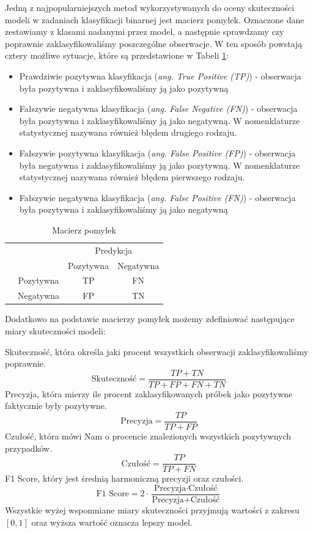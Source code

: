 \documentclass[inzynierska]{pwr_wmat_praca_dyplomowa}
\theoremstyle{plain}
\numberwithin{theorem}{chapter}
\theoremstyle{definition}
\numberwithin{theorem}{chapter}
\begin{document}
Jedną z najpopularniejszych metod wykorzystywanych do oceny skuteczności modeli w zadaniach klasyfikacji binarnej jest macierz pomyłek. Oznaczone dane zestawiamy z klasami nadanymi przez model, a następnie sprawdzamy czy poprawnie zaklasyfikowaliśmy poszczególne obserwacje. W ten sposób powstają cztery możliwe sytuacje, które są przedstawione w Tabeli \ref{macierz-pomylek}: 
\begin{itemize}
	\item Prawdziwie pozytywna klasyfikacja (\textit{ang. True Positive (TP)}) - obserwacja była pozytywna i zaklasyfikowaliśmy ją jako pozytywną
	\item Fałszywie negatywna klasyfikacja (\textit{ang. False Negative (FN)}) - obserwacja była pozytywna i zaklasyfikowaliśmy ją jako negatywną. W nomenklaturze statystycznej nazywana również błędem drugiego rodzaju.
	\item Fałszywie pozytywna klasyfikacja (\textit{ang. False Positive (FP)}) - obserwacja była negatywna i zaklasyfikowaliśmy ją jako pozytywną. W nomenklaturze statystycznej nazywana również błędem pierwszego rodzaju.
	\item Fałszywie negatywna klasyfikacja (\textit{ang. False Positive (FN)}) - obserwacja była pozytywna i zaklasyfikowaliśmy ją jako negatywną
\end{itemize}
\begin{table}[h]
	\begin{center}
		\makegapedcells
		\begin{tabular}{cc|cc}
			\multicolumn{2}{c}{}     &   \multicolumn{2}{c}{Predykcja} \\
			&            &   Pozytywna &   Negatywna     \\ 
			\cline{2-4}
			\multirow{2}{*}{\rotatebox[origin=c]{90}{Prawda}} & Pozytywna   & TP         & FN              \\
			& Negatywna   & FP         & TN              \\ 
			\cline{2-4}
		\end{tabular}
	\end{center}
	\caption{Macierz pomyłek}
	\label{macierz-pomylek}
\end{table}

Dodatkowo na podstawie macierzy pomyłek możemy zdefiniować następujące miary skuteczności modeli:

Skuteczność, która określa jaki procent wszystkich obserwacji zaklasyfikowaliśmy poprawnie.
$$ \text{Skuteczność} = \frac{TP + TN}{TP + FP + FN + TN} $$
Precyzja, która mierzy ile procent zaklasyfikowanych próbek jako pozytywne faktycznie były pozytywne.
$$ \text{Precyzja} = \frac{TP}{TP + FP} $$
Czułość, która mówi Nam o procencie znalezionych wszystkich pozytywnych przypadków.
$$ \text{Czułość}= \frac{TP}{TP + FN} $$
F1 Score, który jest średnią harmoniczną precyzji oraz czułości.
$$ \text{F1 Score} = 2 \cdot \frac{\text{Precyzja} \cdot \text{Czułość}}{\text{Precyzja} + \text{Czułość}} $$
Wszystkie wyżej wspomniane miary skuteczności przyjmują wartości z zakresu $[0,1]$ oraz wyższa wartość oznacza lepszy model.
\end{document}
